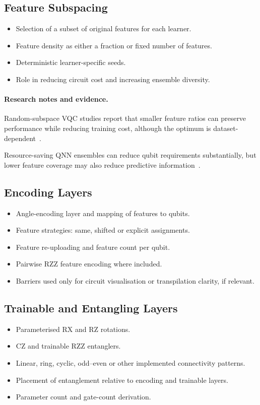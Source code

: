 \documentclass[]{UCD_CS_MSc_AAI_Report}
\newcommand{\result}[1]{{\color{green!60!black}#1}}
\newcommand{\benchmark}[1]{{\color{violet}#1}}
\newcommand{\researchnotes}{\paragraph{Research notes and evidence.}}
\begin{document}
\subsection{Feature Subspacing}
\begin{itemize}
    \item Selection of a subset of original features for each learner.
    \item Feature density as either a fraction or fixed number of features.
    \item Deterministic learner-specific seeds.
    \item Role in reducing circuit cost and increasing ensemble diversity.
\end{itemize}

\researchnotes
\begin{itemize}
    \result{\item Random-subspace VQC studies report that smaller feature ratios can preserve performance while reducing training cost, although the optimum is dataset-dependent~\cite{radojicic_reducing_2026}.}
    \benchmark{\item Resource-saving QNN ensembles can reduce qubit requirements substantially, but lower feature coverage may also reduce predictive information~\cite{incudini_resource_2023}.}
\end{itemize}

\subsection{Encoding Layers}
\begin{itemize}
    \item Angle-encoding layer and mapping of features to qubits.
    \item Feature strategies: same, shifted or explicit assignments.
    \item Feature re-uploading and feature count per qubit.
    \item Pairwise RZZ feature encoding where included.
    \item Barriers used only for circuit visualisation or transpilation clarity, if relevant.
\end{itemize}

\subsection{Trainable and Entangling Layers}
\begin{itemize}
    \item Parameterised RX and RZ rotations.
    \item CZ and trainable RZZ entanglers.
    \item Linear, ring, cyclic, odd--even or other implemented connectivity patterns.
    \item Placement of entanglement relative to encoding and trainable layers.
    \item Parameter count and gate-count derivation.
\end{itemize}
\end{document}
